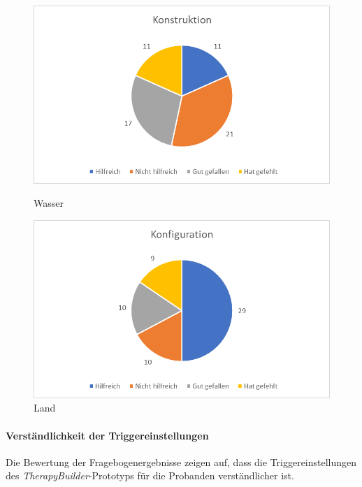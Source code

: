 \begin{figure}
   \begin{minipage}[b]{.49\linewidth} %
      \includegraphics[width=\linewidth]{pictures/diagramme/aussagenkonstr}
      \caption{Wasser}
   \end{minipage}
   \hspace{.01\linewidth}%
   \begin{minipage}[b]{.49\linewidth} %
      \includegraphics[width=\linewidth]{pictures/diagramme/aussagenkonfig}
      \caption{Land}
   \end{minipage}
\end{figure}

\paragraph{Verständlichkeit der Triggereinstellungen}
Die Bewertung der Fragebogenergebnisse zeigen auf, dass die Triggereinstellungen des \emph{TherapyBuilder}-Prototyps für die Probanden verständlicher ist.

